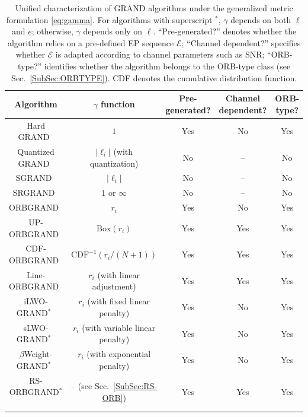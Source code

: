 \documentclass[letterpaper,draftclsnofoot,onecolumn]{IEEEtran}
\begin{document}
\begin{table}[ht]
    \renewcommand{\arraystretch}{1.12}
    \centering
    \begin{tabular}{|c|c|c|c|c|}
    \hline
    \textbf{Algorithm} & \textbf{$\gamma$ function} & \textbf{Pre-generated?} & \textbf{Channel dependent?} & \textbf{ORB-type?} \\ \hline
    Hard GRAND~\cite{duffy2019GRAND} & $1$ & Yes & No & Yes \\ \hline
    Quantized GRAND~\cite{yuan2023guessing} & $|\ell_i|$ (with quantization) & No & -- & No \\ \hline
    SGRAND~\cite{solomon2020SGRAND} & $|\ell_i|$ & No & -- & No \\ \hline
    SRGRAND~\cite{duffy2021SRGRAND} & $1$ or $\infty$ & No & -- & No \\ \hline
    ORBGRAND~\cite{duffy2022ORBGRAND} & $r_i$ & Yes & No & Yes \\ \hline
    UP-ORBGRAND~\cite{liu2022orbgrand} & $\text{Box}(r_i)$ & Yes & Yes & Yes \\ \hline
    CDF-ORBGRAND~\cite{duffy2022ORBGRAND, liu2022orbgrand} & $\text{CDF}^{-1}(r_i/(N{+}1))$ & Yes & Yes & Yes \\ \hline
    Line-ORBGRAND~\cite{duffy2022ORBGRAND} & $r_i$ (with linear adjustment) & Yes & Yes & Yes \\ \hline
    iLWO-GRAND$^{*}$~\cite{condo2021high} & $r_i$ (with fixed linear penalty) & Yes & No & Yes \\ \hline
    sLWO-GRAND$^{*}$~\cite{ji2024efficient} & $r_i$ (with variable linear penalty) & Yes & No & Yes \\ \hline
    $\beta$Weight-GRAND$^{*}$~\cite{wang2023improved} & $r_i$ (with exponential penalty) & Yes & No & Yes \\ \hline
    RS-ORBGRAND$^{*}$~\cite{wan2024approaching} & -- \quad (see Sec.~\ref{SubSec:RS-ORB}) & Yes & Yes & Yes \\ \hline
    \end{tabular}
    \caption{
    Unified characterization of GRAND algorithms under the generalized metric formulation \eqref{eq:gamma}.
    For algorithms with superscript $^{*}$, $\gamma$ depends on both $\underline{\ell}$ and $\underline{e}$; otherwise, $\gamma$ depends only on $\underline{\ell}$. 
    ``Pre-generated?'' denotes whether the algorithm relies on a pre-defined EP sequence $\mathcal{E}$; 
    ``Channel dependent?'' specifies whether $\mathcal{E}$ is adapted according to channel parameters such as SNR; 
    ``ORB-type?'' identifies whether the algorithm belongs to the ORB-type class (see Sec.~\ref{SubSec:ORBTYPE}).
    CDF denotes the cumulative distribution function.
    }
    \label{Tab:1}
\end{table}
\end{document}
